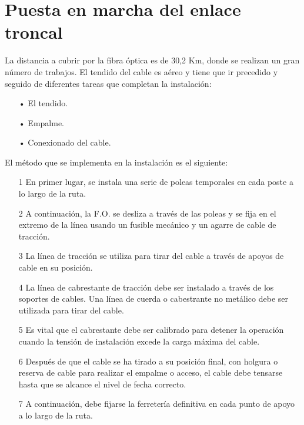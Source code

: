 \section{Puesta en marcha del enlace troncal}
La distancia a cubrir por la fibra óptica es de 30,2 Km, donde se realizan un gran número de trabajos. El tendido del cable es aéreo y tiene que ir precedido y seguido de diferentes tareas que completan la instalación:
\begin{itemize}

\item[•]El tendido.
\item[•]Empalme.
\item[•]Conexionado del cable.



\end{itemize}
El método que se implementa en la instalación es el siguiente:
\begin{enumerate}


\item[1]En primer lugar, se instala una serie de poleas temporales en cada poste a lo largo de la ruta.


\item[2]A continuación, la F.O. se desliza a través de las poleas y se fija en el extremo de la línea usando un fusible mecánico y un agarre de cable de tracción.





\item[3]La línea de tracción se utiliza para tirar del cable a través de apoyos de cable en su posición.

\item[4]La línea de cabrestante de tracción debe ser instalado a través de los soportes de cables. Una línea de cuerda o cabestrante no metálico debe ser utilizada para tirar del cable.

\item[5]Es vital que el cabrestante debe ser calibrado para detener la operación cuando la tensión de instalación excede la carga máxima del cable.

\item[6]Después de que el cable se ha tirado a su posición final, con holgura o reserva de cable para realizar el empalme o acceso, el cable debe tensarse hasta que se alcance el nivel de fecha correcto.

\item[7]A continuación, debe fijarse la ferretería definitiva en cada punto de apoyo a lo largo de la ruta.






\end{enumerate}

